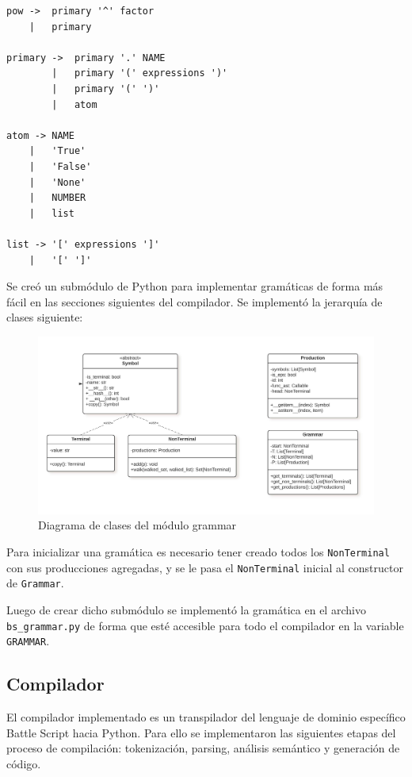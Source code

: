 \begin{verbatim}
pow ->  primary '^' factor              
    |   primary

primary ->  primary '.' NAME            
        |   primary '(' expressions ')'        
        |   primary '(' ')'             
        |   atom

atom -> NAME                            
    |   'True'                          
    |   'False'                         
    |   'None'                          
    |   NUMBER                          
    |   list

list -> '[' expressions ']'             
    |   '[' ']'                         
\end{verbatim}

Se creó un submódulo de Python para implementar gramáticas de forma más fácil en las secciones siguientes del compilador. Se implementó la jerarquía de clases siguiente:

\begin{figure}
        \centering
        \includegraphics[width=13cm]{./chapters/img/grammar.jpeg}
        \caption{Diagrama de clases del módulo grammar}
\end{figure}

Para inicializar una gramática es necesario tener creado todos los \verb|NonTerminal| con sus producciones agregadas, y se le pasa el \verb|NonTerminal| inicial al constructor de \verb|Grammar|.

Luego de crear dicho submódulo se implementó la gramática en el archivo \verb|bs_grammar.py| de forma que esté accesible para todo el compilador en la variable \verb|GRAMMAR|.

\subsection{Compilador}

El compilador implementado es un transpilador del lenguaje de dominio específico Battle Script hacia Python. Para ello se implementaron las siguientes etapas del proceso de compilación: tokenización, parsing, análisis semántico y generación de código.

